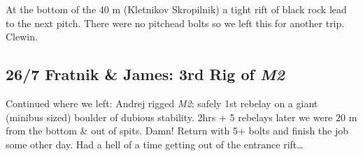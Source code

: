 At the bottom of the 40 m (Kletnikov Skropilnik) a tight rift of black
rock lead to the next pitch. There were no pitchead bolts so we left
this for another trip. Clewin.


\subsection{\texorpdfstring{26/7 Fratnik \& James: 3rd Rig of
\emph{M2}}{26/7 Fratnik \& James: 3rd Rig of M2}}

Continued where we left: Andrej rigged \emph{M2}: safely 1st rebelay on
a giant (minibus sized) boulder of dubious stability. 2hrs + 5 rebelays
later we were 20 m from the bottom \& out of spits. Damn! Return with 5+
bolts and finish the job some other day. Had a hell of a time getting
out of the entrance rift\ldots{}
